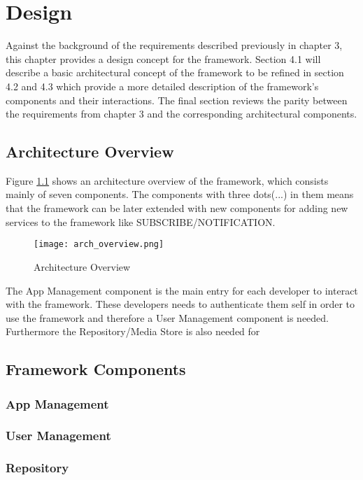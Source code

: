 \chapter{Design\label{cha:chapter4}}
Against the background of the requirements described previously in chapter 3, this chapter provides a design concept for the framework. Section 4.1 will describe a basic architectural concept of the framework to be refined in section 4.2 and 4.3 which provide a more detailed description of the framework's components and their interactions. The final section reviews the parity between the requirements from chapter 3 and the corresponding architectural components. 
        


\section{Architecture Overview\label{sec:des_ar_ov}}
Figure \ref{fig:arch_overview} shows an architecture overview of the framework, which consists mainly of seven components. The components with three dots(...) in them means that the framework can be later extended with new components for adding new services to the framework like SUBSCRIBE/NOTIFICATION.

\begin{figure}[htb]
  \centering
  \texttt{[image: arch\_overview.png]}\\
  \caption{Architecture Overview}
  \label{fig:arch_overview}
\end{figure}

The App Management component is the main entry for each developer to interact with the framework. These developers needs to authenticate them self in order to use the framework and therefore a User Management component is needed. Furthermore the Repository/Media Store is also needed for     
\section{Framework Components\label{sec:des_com}}
\subsection{App Management\label{sec:des_repo}}
\subsection{User Management}
\subsection{Repository\label{sec:des_repo}}
